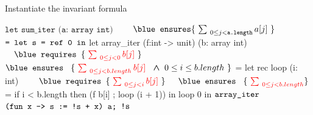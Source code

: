 \begin{frame}[fragile]
{Instantiate the invariant formula}
\begin{footnotesize}
\begin{minipage}[t]{0.3\linewidth}
\begin{whycode} 
   $\texttt{let sum\_iter (a: array int)}$
	$\hspace*{2em}\texttt{\blue ensures}\{~\sum_{~0 \leq j < \texttt{a.length}} a[j]~\}$
   $\color{black}\texttt{=  let s = ref 0 in}$
      let array_iter (f:int -> unit) (b: array int)
	      $\\ \hspace*{1em}\texttt{\blue requires }\{\Rouge{~\sum_{~0 \leq j < 0} b[j]~}\} $
        $\\ \hspace*{0em}\texttt{\blue ensures  }~\{\Rouge{~\sum_{~0 \leq j < b.length} b[j]}~\bwedge 0 \leq i \leq b.length~\}$ 
      = let rec loop (i: int)
	      $\\ \hspace*{2em}\texttt{\blue requires }\{\Rouge{~\sum_{~0 \leq j < i} b[j]~}\} $
        $\\ \hspace*{1em}\texttt{\blue ensures  }~\{\Rouge{~\sum_{~0 \leq j < b.length}}\}$
        = if i < b.length 
          then (f b[i] ; loop (i + 1)) 
        in loop 0   
      in ${\color{black}\texttt{array\_iter }}$ ${\color{black}\texttt{(fun x -> s := !s + x) a;}}$
     ${\color{black}\texttt{!s}}$
\end{whycode}
\end{minipage}
\end{footnotesize}
\end{frame}
\addtocounter{framenumber}{-1}
